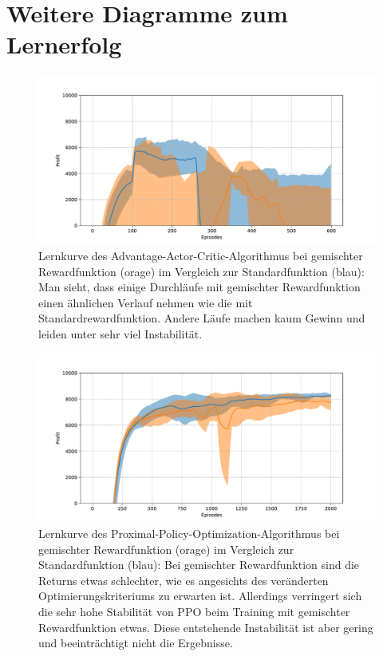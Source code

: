 \section{Weitere Diagramme zum Lernerfolg}
\begin{figure}[htbp]
	\centering
	\includegraphics[width=\textwidth]{appendix/mixed_rewards_a2c.pdf}
	\caption{
		Lernkurve des Advantage-Actor-Critic-Algorithmus bei gemischter Rewardfunktion (orage) im Vergleich zur Standardfunktion (blau):
		Man sieht, dass einige Durchläufe mit gemischter Rewardfunktion einen ähnlichen Verlauf nehmen wie die mit Standardrewardfunktion.
		Andere Läufe machen kaum Gewinn und leiden unter sehr viel Instabilität.
	}
	\label{graphic:MixedRewardsA2C}
\end{figure}
\begin{figure}[htbp]
	\centering
	\includegraphics[width=\textwidth]{appendix/mixed_rewards_ppo.pdf}
	\caption{
		Lernkurve des Proximal-Policy-Optimization-Algorithmus bei gemischter Rewardfunktion (orage) im Vergleich zur Standardfunktion (blau):
		Bei gemischter Rewardfunktion sind die Returns etwas schlechter, wie es angesichts des veränderten Optimierungskriteriums zu erwarten ist.
		Allerdings verringert sich die sehr hohe Stabilität von PPO beim Training mit gemischter Rewardfunktion etwas.
		Diese entstehende Instabilität ist aber gering und beeinträchtigt nicht die Ergebnisse.
	}
	\label{graphic:MixedRewardsPPO}
\end{figure}
